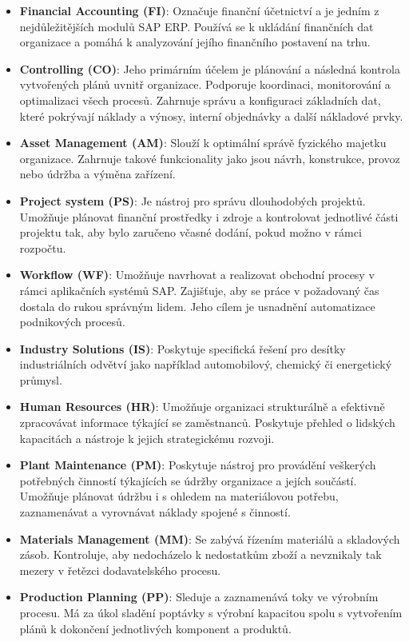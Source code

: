 \documentclass[thesis=M,czech]{FITthesis}[2012/06/26]
\begin{document}
\begin{itemize}
	\item
	\textbf{Financial Accounting (FI)}: Označuje finanční účetnictví a je jedním z nejdůležitějších modulů SAP ERP. Používá se k ukládání finančních dat organizace a pomáhá k analyzování jejího finančního postavení na trhu.
	\item
	\textbf{Controlling (CO)}: Jeho primárním účelem je plánování a následná kontrola vytvořených plánů uvnitř organizace. Podporuje koordinaci, monitorování a optimalizaci všech procesů. Zahrnuje správu a konfiguraci základních dat, které pokrývají náklady a výnosy, interní objednávky a další nákladové prvky. 
	\item
	\textbf{Asset Management (AM)}: Slouží k optimální správě fyzického majetku organizace. Zahrnuje takové funkcionality jako jsou návrh, konstrukce, provoz nebo údržba a výměna zařízení.
	\item
	\textbf{Project system (PS)}: Je nástroj pro správu dlouhodobých projektů. Umožňuje plánovat finanční prostředky i zdroje a kontrolovat jednotlivé části projektu tak, aby bylo zaručeno včasné dodání, pokud možno v rámci rozpočtu.
	\item
	\textbf{Workflow (WF)}: Umožňuje navrhovat a realizovat obchodní procesy v rámci aplikačních systémů SAP. Zajišťuje, aby se práce v požadovaný čas dostala do rukou správným lidem. Jeho cílem je usnadnění automatizace podnikových procesů.
	\item
	\textbf{Industry Solutions (IS)}: Poskytuje specifická řešení pro desítky industriálních odvětví jako například automobilový, chemický či energetický průmysl.
	\item
	\textbf{Human Resources (HR)}: Umožňuje organizaci strukturálně a efektivně zpracovávat informace týkající se zaměstnanců. Poskytuje přehled o lidských kapacitách a nástroje k jejich strategickému rozvoji.
	\item
	\textbf{Plant Maintenance (PM)}: Poskytuje nástroj pro provádění veškerých potřebných činností týkajících se údržby organizace a jejích součástí. Umožňuje plánovat údržbu i s ohledem na materiálovou potřebu, zaznamenávat a vyrovnávat náklady spojené s činností.
	\item
	\textbf{Materials Management (MM)}: Se zabývá řízením materiálů a skladových zásob. Kontroluje, aby nedocházelo k nedostatkům zboží a nevznikaly tak mezery v řetězci dodavatelského procesu.
	\item
	\textbf{Production Planning (PP)}: Sleduje a zaznamenává toky ve výrobním procesu. Má za úkol sladění poptávky s výrobní kapacitou spolu s vytvořením plánů k dokončení jednotlivých komponent a produktů.

\end{itemize}
\end{document}
